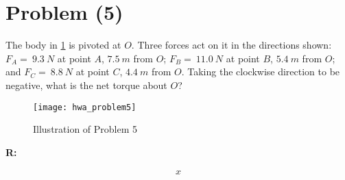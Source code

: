 \section{Problem (5)}
	The body in \cref{fig:hwa_problem5} is pivoted at $O$. Three forces act on it in the directions shown: $F_{A} = \ 9.3 \ N$ at point $A$, $7.5 \ m$ from $O$; $F_{B} = \ 11.0 \ N$ at point $B$, $5.4 \ m$ from $O$; and $F_{C} = \ 8.8 \ N$ at point $C$, $4.4 \ m$ from $O$. Taking the clockwise direction to be negative, what is the net torque about $O$?

	\begin{figure}[H]
		\begin{center}
			\texttt{[image: hwa\_problem5]}
			\caption{Illustration of Problem 5}
			\label{fig:hwa_problem5}
		\end{center}
	\end{figure}

	\textbf{R:}

	\begin{align}
		x
	\end{align}

